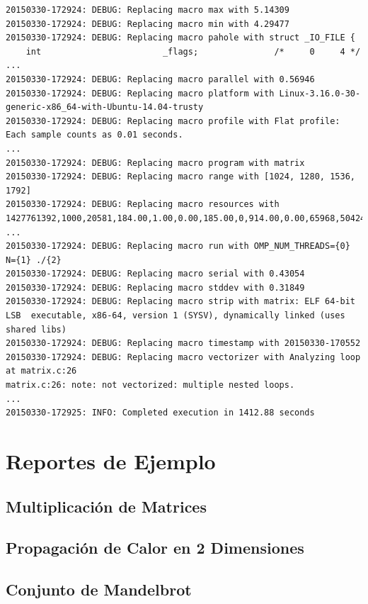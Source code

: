 \documentclass[a4paper]{report}
\begin{document}
\begin{lstlisting}[caption={Salida de Ejemplo},basicstyle=\tiny,label={lst:log}]
20150330-172924: DEBUG: Replacing macro max with 5.14309
20150330-172924: DEBUG: Replacing macro min with 4.29477
20150330-172924: DEBUG: Replacing macro pahole with struct _IO_FILE {
	int                        _flags;               /*     0     4 */
...
20150330-172924: DEBUG: Replacing macro parallel with 0.56946
20150330-172924: DEBUG: Replacing macro platform with Linux-3.16.0-30-generic-x86_64-with-Ubuntu-14.04-trusty
20150330-172924: DEBUG: Replacing macro profile with Flat profile:
Each sample counts as 0.01 seconds.
...
20150330-172924: DEBUG: Replacing macro program with matrix
20150330-172924: DEBUG: Replacing macro range with [1024, 1280, 1536, 1792]
20150330-172924: DEBUG: Replacing macro resources with 1427761392,1000,20581,184.00,1.00,0.00,185.00,0,914.00,0.00,65968,50424,1.25
...
20150330-172924: DEBUG: Replacing macro run with OMP_NUM_THREADS={0} N={1} ./{2}
20150330-172924: DEBUG: Replacing macro serial with 0.43054
20150330-172924: DEBUG: Replacing macro stddev with 0.31849
20150330-172924: DEBUG: Replacing macro strip with matrix: ELF 64-bit LSB  executable, x86-64, version 1 (SYSV), dynamically linked (uses shared libs)
20150330-172924: DEBUG: Replacing macro timestamp with 20150330-170552
20150330-172924: DEBUG: Replacing macro vectorizer with Analyzing loop at matrix.c:26
matrix.c:26: note: not vectorized: multiple nested loops.
...
20150330-172925: INFO: Completed execution in 1412.88 seconds
\end{lstlisting}

\chapter{Reportes de Ejemplo} \label{examples}

\section{Multiplicación de Matrices}  \label{example-matrix}


\section{Propagación de Calor en 2 Dimensiones} \label{example-heat2d}


\section{Conjunto de Mandelbrot} \label{example-mandel}

\end{document}
